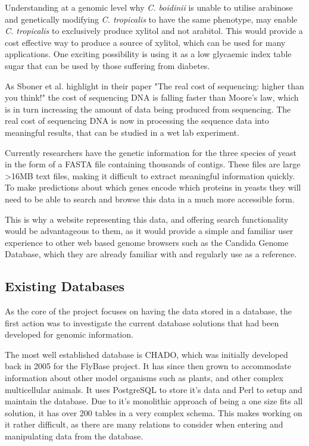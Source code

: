 Understanding at a genomic level why \textit{C. boidinii} is unable to utilise arabinose and genetically modifying \textit{C. tropicalis} to have the same phenotype, may enable \textit{C. tropicalis} to exclusively produce xylitol and not arabitol. This would provide a cost effective way to produce a source of xylitol, which can be used for many applications. One exciting possibility is using it as a low glycaemic index table sugar that can be used by those suffering from diabetes.

As Sboner et al. highlight in their paper "The real cost of sequencing: higher than you think!"\cite{sequencingcost} the cost of sequencing DNA is falling faster than Moore's law, which is in turn increasing the amount of data being produced from sequencing. The real cost of sequencing DNA is now in processing the sequence data into meaningful results, that can be studied in a wet lab experiment. 

Currently researchers have the genetic information for the three species of yeast in the form of a FASTA file containing thousands of contigs. These files are large \textgreater 16MB text files, making it difficult to extract meaningful information quickly. To make predictions about which genes encode which proteins in yeasts they will need to be able to search and browse this data in a much more accessible form.

This is why a website representing this data, and offering search functionality would be advantageous to them, as it would provide a simple and familiar user experience to other web based genome browsers such as the Candida Genome Database\cite{cgd}, which they are already familiar with and regularly use as a reference. 

\subsection{Existing Databases}
As the core of the project focuses on having the data stored in a database, the first action was to investigate the current database solutions that had been developed for genomic information. 

The most well established database is CHADO\cite{chado}, which was initially developed back in 2005 for the FlyBase\cite{flybase} project. It has since then grown to accommodate information about other model organisms such as plants, and other complex multicellular animals. It uses PostgreSQL\cite{postgres} to store it's data and Perl\cite{perl} to setup and maintain the database. Due to it's monolithic approach of being a one size fits all solution, it has over 200 tables in a very complex schema. This makes working on it rather difficult, as there are many relations to consider when entering and manipulating data from the database.

